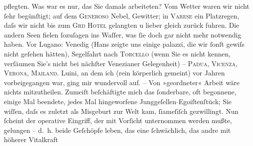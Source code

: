 \begin{ledgroupsized}[t]{13cm}
                    pflegten. Was war es nur, das Sie damals arbeiteten? Vom Wetter waren wir nicht
                    ſehr begünſtigt; auf dem \textsc{Generoso} Nebel, Gewitter; in \textsc{Varese} ein Platzregen, daſs wir nicht \introOben{}bis\introOben{} zum \textsc{Grd Hotel} gelangten u lieber gleich zurück fuhren. Die andern Seen fielen ſozuſagen
                    ins Waſſer, was ſie doch gar nicht mehr notwendig haben. Vor Lugano: Venedig (Hans zeigte uns einige {\pb}palazzi, die wir ſonſt gewiſs nicht geſehen
                    hätten), Segelfahrt nach \textsc{Torcello} (wenn Sie es nicht kennen, verſäumen Sie’s nicht bei nächſter Venezianer Gelegenheit) – \textsc{Padua}, \textsc{Vicenza}, \textsc{Verona}, \textsc{Mailand}. Luini, an dem ich (rein körperlich
                    gemeint) vor Jahren vorbeigegangen war, ging mir wundervoll auf. –\pend
           \pstart
           Von »geordneter« Arbeit wäre nichts mitzutheilen. Zumeiſt beſchäftigte mich das
                    ſonderbare, {\pb}oft begonnene, einige Mal beendete,
                    jedes Mal hingeworfene Junggeſellen\textcolor{gray}{-}Egoiſtenſtück; Sie wiſſen, daſs es
                    zuletzt als Misgeburt zur Welt kam, ſiameſiſch gezwillingt. Nun ſcheint der
                    operative Eingriff, der mit Vorſicht unternommen werden mußte, gelungen – d. h.
                    beide Geſchöpfe leben, das eine ſchwächlich, das andre mit höherer Vitalkraft

\end{ledgroupsized}
